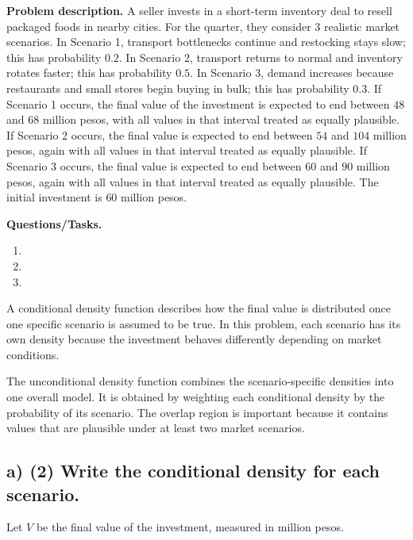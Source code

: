 \textbf{Problem description.}
A seller invests in a short-term inventory deal to resell packaged foods in nearby cities. For the quarter, they consider 3 realistic market scenarios. In Scenario 1, transport bottlenecks continue and restocking stays slow; this has probability $0.2$. In Scenario 2, transport returns to normal and inventory rotates faster; this has probability $0.5$. In Scenario 3, demand increases because restaurants and small stores begin buying in bulk; this has probability $0.3$. If Scenario 1 occurs, the final value of the investment is expected to end between $48$ and $68$ million pesos, with all values in that interval treated as equally plausible. If Scenario 2 occurs, the final value is expected to end between $54$ and $104$ million pesos, again with all values in that interval treated as equally plausible. If Scenario 3 occurs, the final value is expected to end between $60$ and $90$ million pesos, again with all values in that interval treated as equally plausible. The initial investment is $60$ million pesos.

\textbf{Questions/Tasks.}
\begin{enumerate}[label=\textbf{\alph*)}]
	\item {}
	\item {}
	\item {}
\end{enumerate}

A conditional density function describes how the final value is distributed once one specific scenario is assumed to be true. In this problem, each scenario has its own density because the investment behaves differently depending on market conditions.

The unconditional density function combines the scenario-specific densities into one overall model. It is obtained by weighting each conditional density by the probability of its scenario. The overlap region is important because it contains values that are plausible under at least two market scenarios.

\subsection*{a) \textbf{(2)} Write the conditional density for each scenario.}
\label{subsec:three-scenario-inventory-investment-c2-a}
Let $V$ be the final value of the investment, measured in million pesos.

